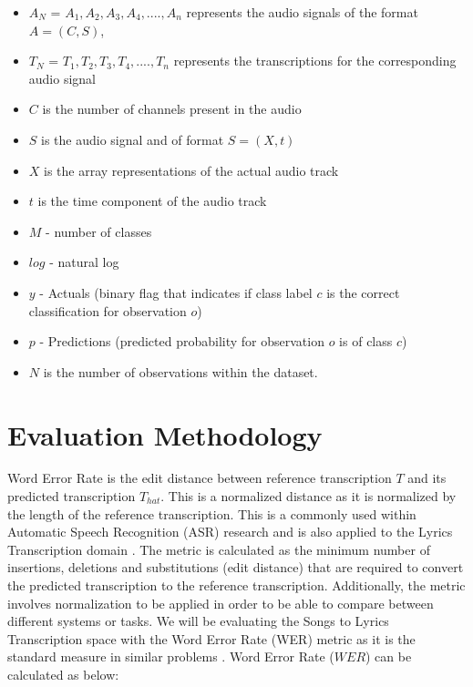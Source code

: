 \begin{itemize}
    \item $A_N$ = $A_{1},A_2,A_3,A_4,...., A_n$ represents the audio signals of the format $A = (C,S)$, 
    \item $T_N$ = $T_1,T_2,T_3,T_4,....,T_n$ represents the transcriptions for the corresponding audio signal
    \item $C$ is the number of channels present in the audio
    \item $S$ is the audio signal and of format $S = (X,t)$
    \item $X$ is the array representations of the actual audio track
    \item $t$ is the time component of the audio track
    \item $M$ - number of classes
    \item $log$ - natural log 
    \item $y$ - Actuals (binary flag that indicates if class label $c$ is the correct classification for observation $o$)
    \item $p$ - Predictions (predicted probability for observation $o$ is of class $c$)
    \item $N$ is the number of observations within the dataset.
\end{itemize}


\section{Evaluation Methodology}%
\label{sec:evaluationmetric}

Word Error Rate \cite{zechner2000minimizing} is the edit distance between reference transcription $T$ and its predicted transcription $T_{hat}$. This is a normalized distance as 
it is normalized by the length of the reference transcription. This is a commonly used within Automatic Speech Recognition (ASR) research \cite{zechner2000minimizing} \cite{baevski2020wav2vec} \cite{mccowan2004use}  and is also applied to the Lyrics Transcription domain \cite{ou2022transfer} \cite{gu2022mm}. The metric is calculated as the minimum number of insertions, deletions and substitutions (edit distance) that are required to convert the predicted transcription to the reference transcription. Additionally, the metric involves normalization to be applied in order to be able to compare between different systems or tasks. We will be evaluating the Songs to Lyrics Transcription space with the Word Error Rate (WER) metric as it is the standard measure in similar problems \cite{ou2022transfer} \cite{xu2021self}. Word Error Rate ($WER$) can be calculated as below: 

